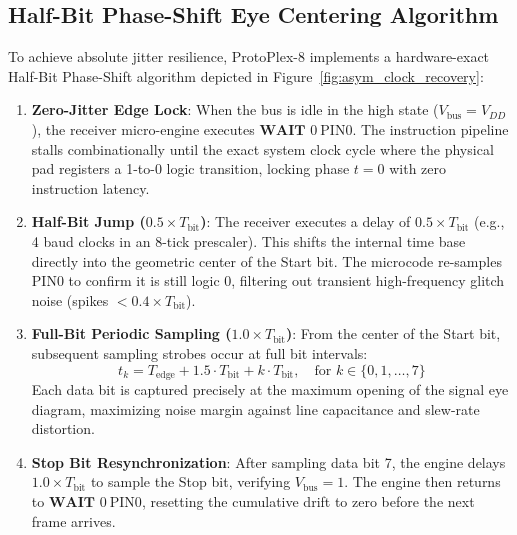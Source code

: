 \documentclass[11pt,a4paper]{article}
\begin{document}
\subsection{Half-Bit Phase-Shift Eye Centering Algorithm}
To achieve absolute jitter resilience, ProtoPlex-8 implements a hardware-exact Half-Bit Phase-Shift algorithm depicted in Figure~\ref{fig:asym_clock_recovery}:

\begin{enumerate}
    \item \textbf{Zero-Jitter Edge Lock}: When the bus is idle in the high state ($V_{\text{bus}} = V_{DD}$), the receiver micro-engine executes $\textbf{WAIT } 0\ \text{PIN0}$. The instruction pipeline stalls combinationally until the exact system clock cycle where the physical pad registers a 1-to-0 logic transition, locking phase $t=0$ with zero instruction latency.
    \item \textbf{Half-Bit Jump ($0.5 \times T_{\text{bit}}$)}: The receiver executes a delay of $0.5 \times T_{\text{bit}}$ (e.g., 4 baud clocks in an 8-tick prescaler). This shifts the internal time base directly into the geometric center of the Start bit. The microcode re-samples PIN0 to confirm it is still logic 0, filtering out transient high-frequency glitch noise (spikes $< 0.4 \times T_{\text{bit}}$).
    \item \textbf{Full-Bit Periodic Sampling ($1.0 \times T_{\text{bit}}$)}: From the center of the Start bit, subsequent sampling strobes occur at full bit intervals:
    \begin{equation}
        t_k = T_{\text{edge}} + 1.5 \cdot T_{\text{bit}} + k \cdot T_{\text{bit}}, \quad \text{for } k \in \{0, 1, \dots, 7\}
    \end{equation}
    Each data bit is captured precisely at the maximum opening of the signal eye diagram, maximizing noise margin against line capacitance and slew-rate distortion.
    \item \textbf{Stop Bit Resynchronization}: After sampling data bit 7, the engine delays $1.0 \times T_{\text{bit}}$ to sample the Stop bit, verifying $V_{\text{bus}} = 1$. The engine then returns to $\textbf{WAIT } 0\ \text{PIN0}$, resetting the cumulative drift to zero before the next frame arrives.
\end{enumerate}
\end{document}
